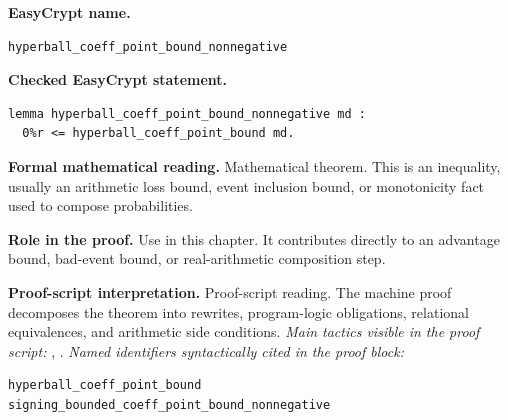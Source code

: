 \begin{formaltheorem}
\noindent\textbf{EasyCrypt name.}
\begin{lstlisting}[language=EasyCrypt,basicstyle=\ttfamily\scriptsize]
hyperball_coeff_point_bound_nonnegative
\end{lstlisting}
\noindent\textbf{Checked EasyCrypt statement.}
\begin{lstlisting}[language=EasyCrypt,basicstyle=\ttfamily\scriptsize]
lemma hyperball_coeff_point_bound_nonnegative md :
  0%r <= hyperball_coeff_point_bound md.
\end{lstlisting}
\noindent\textbf{Formal mathematical reading.}
Mathematical theorem. This is an inequality, usually an arithmetic loss bound, event inclusion bound, or monotonicity fact used to compose probabilities.

\noindent\textbf{Role in the proof.}
Use in this chapter. It contributes directly to an advantage bound, bad-event bound, or real-arithmetic composition step.

\noindent\textbf{Proof-script interpretation.}
Proof-script reading. The machine proof decomposes the theorem into rewrites, program-logic obligations, relational equivalences, and arithmetic side conditions.
\emph{Main tactics visible in the proof script:} , .
\emph{Named identifiers syntactically cited in the proof block:}
\begin{lstlisting}[language=EasyCrypt,basicstyle=\ttfamily\scriptsize]
hyperball_coeff_point_bound
signing_bounded_coeff_point_bound_nonnegative
\end{lstlisting}

\end{formaltheorem}

